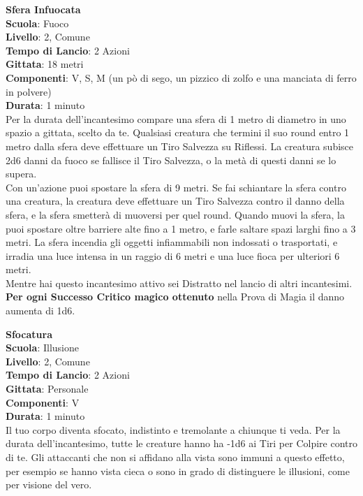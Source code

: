 \begin{multicols}{2}
\medskip\textbf{Sfera Infuocata}\\
\textbf{Scuola}: Fuoco\\
\textbf{Livello}: 2, Comune\\
\textbf{Tempo di Lancio}: 2 Azioni\\
\textbf{Gittata}: 18 metri\\
\textbf{Componenti}: V, S, M (un pò di sego, un pizzico di zolfo e una manciata di ferro in polvere)\\
\textbf{Durata}: 1 minuto\\
Per la durata dell'incantesimo compare una sfera di 1 metro di diametro in uno spazio a gittata, scelto da te. Qualsiasi creatura che termini il suo round entro 1 metro dalla sfera deve effettuare un Tiro Salvezza su Riflessi. La creatura subisce 2d6 danni da fuoco se fallisce il Tiro Salvezza, o la metà di questi danni se lo supera.\\
Con un'azione puoi spostare la sfera di 9 metri. Se fai schiantare la sfera contro una creatura, la creatura deve effettuare un Tiro Salvezza contro il danno della sfera, e la sfera smetterà di muoversi per quel round.
Quando muovi la sfera, la puoi spostare oltre barriere alte fino a 1 metro, e farle saltare spazi larghi fino a 3 metri. La sfera incendia gli oggetti infiammabili non indossati o trasportati, e irradia una luce intensa in un raggio di 6 metri e una luce fioca per ulteriori 6 metri.\\
Mentre hai questo incantesimo attivo sei Distratto nel lancio di altri incantesimi.\\
\textbf{Per ogni Successo Critico magico ottenuto} nella Prova di Magia il danno aumenta di 1d6.

\medskip\textbf{Sfocatura}\\
\textbf{Scuola}: Illusione\\
\textbf{Livello}: 2, Comune\\
\textbf{Tempo di Lancio}: 2 Azioni\\
\textbf{Gittata}: Personale\\
\textbf{Componenti}: V\\
\textbf{Durata}: 1 minuto \\
Il tuo corpo diventa sfocato, indistinto e tremolante a chiunque ti veda. Per la durata dell'incantesimo, tutte le creature hanno ha -1d6 ai Tiri per Colpire contro di te. Gli attaccanti che non si affidano alla vista sono immuni a questo effetto, per esempio se hanno vista cieca o sono in grado di distinguere le illusioni, come per visione del vero.


\end{multicols}
